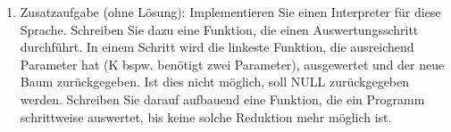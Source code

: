 \documentclass{scrartcl}
\begin{document}
\begin{enumerate}[1.]
\item Zusatzaufgabe (ohne Lösung): Implementieren Sie einen Interpreter für diese Sprache. Schreiben Sie dazu eine Funktion, die einen Auswertungsschritt durchführt. In einem Schritt wird die linkeste Funktion, die ausreichend Parameter hat (K bspw. benötigt zwei Parameter), ausgewertet und der neue Baum zurückgegeben. Ist dies nicht möglich, soll NULL zurückgegeben werden.
Schreiben Sie darauf aufbauend eine Funktion, die ein Programm schrittweise auswertet, bis keine solche Reduktion mehr möglich ist.
\end{enumerate} 
\end{document}
